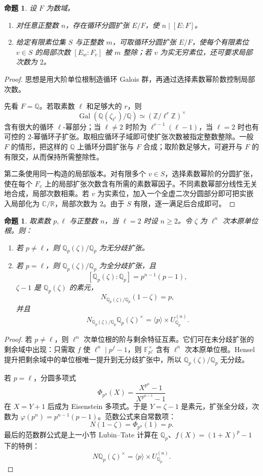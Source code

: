 \documentclass[11pt,a4paper,openany]{ctexbook}
\numberwithin{equation}{chapter}
\newcommand{\Q}{\mathbb{Q}}
\newcommand{\R}{\mathbb{R}}
\newcommand{\C}{\mathbb{C}}
\newcommand{\Z}{\mathbb{Z}}
\newcommand{\F}{\mathbb{F}}
\newcommand{\Gal}{\operatorname{Gal}}
\theoremstyle{plain}
\newtheorem{proposition}[theorem]{命题}
\theoremstyle{definition}
\theoremstyle{remark}
\begin{document}
\begin{proposition}
设 $F$ 为数域。
\begin{enumerate}
\item 对任意正整数 $n$，存在循环分圆扩张 $E/F$，使 $n\mid [E:F]$。
\item 给定有限素位集 $S$ 与正整数 $m$，可取循环分圆扩张 $E/F$，使每个有限素位 $v\in S$ 的局部次数 $[E_w:F_v]$ 被 $m$ 整除；若 $v$ 为实无穷素位，还可要求局部次数为 $2$。
\end{enumerate}
\end{proposition}

\begin{proof}
思想是用大阶单位根制造循环 Galois 群，再通过选择素数幂阶数控制局部次数。

先看 $F=\Q$。若取素数 $\ell$ 和足够大的 $r$，则
\[
\Gal(\Q(\zeta_{\ell^r})/\Q)\simeq(\Z/\ell^r\Z)^\times
\]
含有很大的循环 $\ell$-幂部分；当 $\ell\ne2$ 时阶为 $\ell^{r-1}(\ell-1)$，当 $\ell=2$ 时也有可控的 $2$-幂循环子扩张。取相应循环子域即可使扩张次数被指定整数整除。一般 $F$ 的情形，把这样的 $\Q$ 上循环分圆扩张与 $F$ 合成；取阶数足够大，可避开与 $F$ 的有限交，从而保持所需整除性。

第二条使用同一构造的局部版本。对有限多个 $v\in S$，选择素数幂阶的分圆扩张，使在每个 $F_v$ 上的局部扩张次数含有所需的素数幂因子。不同素数幂部分线性无关地合成，局部次数相乘。若 $v$ 为实素位，加入一个全虚二次分圆部分即可把实嵌入局部化为 $\C/\R$，局部次数为 $2$。由于 $S$ 有限，逐一满足后合成即可。
\end{proof}

\begin{proposition}
取素数 $p,\ell$ 与正整数 $n$，当 $\ell=2$ 时设 $n\ge2$。令 $\zeta$ 为 $\ell^n$ 次本原单位根。则：
\begin{enumerate}
\item 若 $p\ne\ell$，则 $\Q_p(\zeta)/\Q_p$ 为无分歧扩张。
\item 若 $p=\ell$，则 $\Q_p(\zeta)/\Q_p$ 为全分歧扩张，且
\[
[\Q_p(\zeta):\Q_p]=p^{n-1}(p-1),
\]
$\zeta-1$ 是 $\Q_p(\zeta)$ 的素元，
\[
N_{\Q_p(\zeta)/\Q_p}(1-\zeta)=p,
\]
并且
\[
N_{\Q_p(\zeta)/\Q_p}\Q_p(\zeta)^\times
=\langle p\rangle\times U_{\Q_p}^{(n)}.
\]
\end{enumerate}
\end{proposition}

\begin{proof}
若 $p\ne\ell$，则 $\ell^n$ 次单位根的阶与剩余特征互素。它们可在未分歧扩张的剩余域中出现：只需取 $f$ 使 $\ell^n\mid p^f-1$，则 $\F_{p^f}^\times$ 含有 $\ell^n$ 次本原单位根。Hensel 提升把剩余域中的单位根唯一提升到无分歧扩张中，所以 $\Q_p(\zeta)/\Q_p$ 无分歧。

若 $p=\ell$，分圆多项式
\[
\Phi_{p^n}(X)=\frac{X^{p^n}-1}{X^{p^{n-1}}-1}
\]
在 $X=Y+1$ 后成为 Eisenstein 多项式。于是 $Y=\zeta-1$ 是素元，扩张全分歧，次数为 $\varphi(p^n)=p^{n-1}(p-1)$。范数公式来自常数项：
\[
N(1-\zeta)=\Phi_{p^n}(1)=p.
\]
最后的范数群公式是上一小节 Lubin--Tate 计算在 $\Q_p$、$f(X)=(1+X)^p-1$ 下的特例：
\[
N\Q_p(\zeta)^\times=\langle p\rangle\times U_{\Q_p}^{(n)}.
\]
\end{proof}
\end{document}
